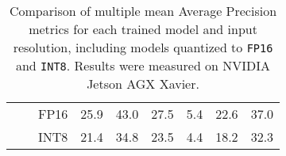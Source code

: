 \begin{appendices}
\begin{table}[t]
\begin{threeparttable}
\begin{tabular}{|c|c|c|rrrrrr|}
                                        &                                  & FP16 & 25.9 & 43.0 & 27.5 &  5.4 & 22.6 & 37.0 \\
                                        &                                  & INT8 & 21.4 & 34.8 & 23.5 &  4.4 & 18.2 & 32.3 \\
            \hline
        \end{tabular}
        \caption{Comparison of multiple mean Average Precision metrics for each
        trained model and input resolution, including models quantized to
        \texttt{FP16} and \texttt{INT8}. Results were measured on NVIDIA Jetson AGX
        Xavier.}
        \label{mAPTableBigFig}
    \end{threeparttable}
    \normalsize
\end{table}


\end{appendices}

% 
